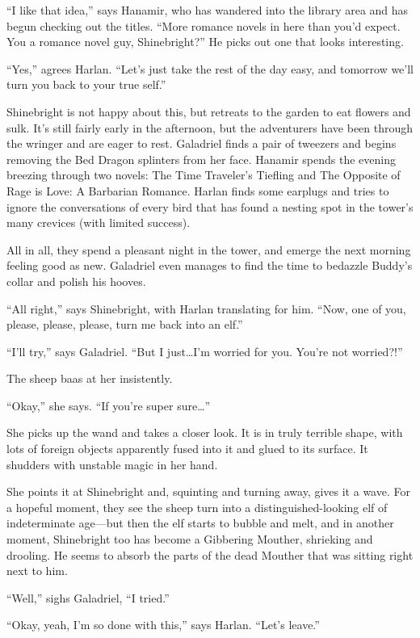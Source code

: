 \documentclass[smalldemyvopaper,11pt,twoside,onecolumn,openright,extrafontsizes]{memoir}
\begin{document}
``I like that idea,'' says Hanamir, who has wandered into the library
area and has begun checking out the titles. ``More romance novels in
here than you'd expect. You a romance novel guy, Shinebright?'' He picks
out one that looks interesting.

``Yes,'' agrees Harlan. ``Let's just take the rest of the day easy, and
tomorrow we'll turn you back to your true self.''

Shinebright is not happy about this, but retreats to the garden to eat
flowers and sulk. It's still fairly early in the afternoon, but the
adventurers have been through the wringer and are eager to rest.
Galadriel finds a pair of tweezers and begins removing the Bed Dragon
splinters from her face. Hanamir spends the evening breezing through two
novels: The Time Traveler's Tiefling and The Opposite of Rage is Love: A
Barbarian Romance. Harlan finds some earplugs and tries to ignore the
conversations of every bird that has found a nesting spot in the tower's
many crevices (with limited success).

All in all, they spend a pleasant night in the tower, and emerge the
next morning feeling good as new. Galadriel even manages to find the
time to bedazzle Buddy's collar and polish his hooves.

``All right,'' says Shinebright, with Harlan translating for him. ``Now,
one of you, please, please, please, turn me back into an elf.''

``I'll try,'' says Galadriel. ``But I just\ldots I'm worried for you.
You're not worried?!''

The sheep baas at her insistently.

``Okay,'' she says. ``If you're super sure\ldots{}''

She picks up the wand and takes a closer look. It is in truly terrible
shape, with lots of foreign objects apparently fused into it and glued
to its surface. It shudders with unstable magic in her hand.

She points it at Shinebright and, squinting and turning away, gives it a
wave. For a hopeful moment, they see the sheep turn into a
distinguished-looking elf of indeterminate age---but then the elf starts
to bubble and melt, and in another moment, Shinebright too has become a
Gibbering Mouther, shrieking and drooling. He seems to absorb the parts
of the dead Mouther that was sitting right next to him.

``Well,'' sighs Galadriel, ``I tried.''

``Okay, yeah, I'm so done with this,'' says Harlan. ``Let's leave.''
\end{document}

